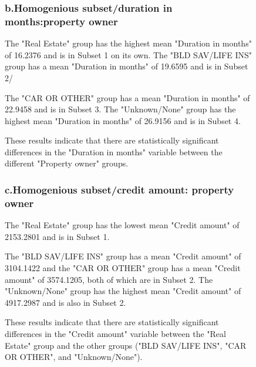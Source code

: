 \documentclass[english,10pt,a4paper]{article}
\begin{document}
\begin{figure}[h]
\subsubsection*{b.Homogenious subset/duration in months:property owner}
The "Real Estate" group has the highest mean "Duration in months" of 16.2376 and is in Subset 1 on its own.
The "BLD SAV/LIFE INS" group has a mean "Duration in months" of 19.6595 and is in Subset 2/

The "CAR OR OTHER" group has a mean "Duration in months" of 22.9458 and is in Subset 3.
The "Unknown/None" group has the highest mean "Duration in months" of 26.9156 and is in Subset 4.


These results indicate that there are statistically significant differences in the "Duration in months" variable between the different "Property owner" groups.


\subsubsection*{c.Homogenious subset/credit amount: property owner}
The "Real Estate" group has the lowest mean "Credit amount" of 2153.2801 and is in Subset 1.

The "BLD SAV/LIFE INS" group has a mean "Credit amount" of 3104.1422 and the "CAR OR OTHER" group has a mean "Credit amount" of 3574.1205, both of which are in Subset 2.
The "Unknown/None" group has the highest mean "Credit amount" of 4917.2987 and is also in Subset 2.

These results indicate that there are statistically significant differences in the "Credit amount" variable between the "Real Estate" group and the other groups ("BLD SAV/LIFE INS", "CAR OR OTHER", and "Unknown/None"). 

\end{figure}
\end{document}
